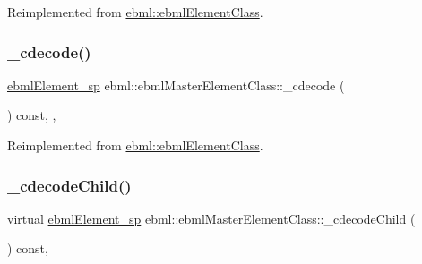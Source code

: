 Reimplemented from \mbox{\hyperlink{classebml_1_1ebmlElementClass_a81f0713cca953599d74185aa24c4c2c1}{ebml\+::ebml\+Element\+Class}}.

\mbox{\label{classebml_1_1ebmlMasterElementClass_a6ef689ac153338400cfb8367edd32f54}} 
\subsubsection{\texorpdfstring{\+\_\+cdecode()}{\_cdecode()}\hspace{0.1cm}{\footnotesize\ttfamily [2/2]}}
{\footnotesize\ttfamily \mbox{\hyperlink{namespaceebml_adad533b7705a16bb360fe56380c5e7be}{ebml\+Element\+\_\+sp}} ebml\+::ebml\+Master\+Element\+Class\+::\+\_\+cdecode (\begin{DoxyParamCaption}\item[{const \mbox{\hyperlink{classebml_1_1parseFile}{parse\+File}} \&}]{ }\end{DoxyParamCaption}) const\hspace{0.3cm}{\ttfamily [override]}, {\ttfamily [protected]}, {\ttfamily [virtual]}}



Reimplemented from \mbox{\hyperlink{classebml_1_1ebmlElementClass_ae423476637d4ca052cd7aa0047f2b3eb}{ebml\+::ebml\+Element\+Class}}.

\mbox{\label{classebml_1_1ebmlMasterElementClass_a3cdeaebf9f16bdebfb72006410f3d76e}} 
\subsubsection{\texorpdfstring{\+\_\+cdecode\+Child()}{\_cdecodeChild()}\hspace{0.1cm}{\footnotesize\ttfamily [1/2]}}
{\footnotesize\ttfamily virtual \mbox{\hyperlink{namespaceebml_adad533b7705a16bb360fe56380c5e7be}{ebml\+Element\+\_\+sp}} ebml\+::ebml\+Master\+Element\+Class\+::\+\_\+cdecode\+Child (\begin{DoxyParamCaption}\item[{const \mbox{\hyperlink{classebml_1_1parseString}{parse\+String}} \&}]{ }\end{DoxyParamCaption}) const\hspace{0.3cm}{\ttfamily [protected]}, {\ttfamily [virtual]}}

